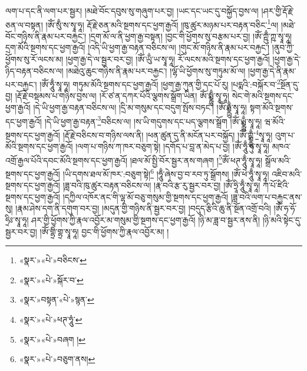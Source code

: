 ལག་པ་དང་ནི་ལག་པར་སྦྱར། །མཐེ་བོང་དབུས་སུ་གཞུག་པར་བྱ། །ཡང་དང་ཡང་དུ་བསྐྱོད་བྱས་ལ། །ཤར་གྱི་རྡོ་རྗེ་ཅན་ལ་བསྟན། །ཨོཾ་སུྃ་ས་སྭཱ་ཧཱ། རྡོ་རྗེ་ཅན་མའི་སྔགས་དང་ཕྱག་རྒྱའོ། །ཁུ་ཚུར་མཉམ་པར་བརྟན་བཅིང་\footnote{«སྣར་»«པེ་»བཅིངས་}ལ། །མཐེ་བོང་གཉིས་ནི་རྣམ་པར་བརྐྱང་། །དྲག་མོ་ལ་ནི་ཕྱག་རྒྱ་བསྟན། །བྱང་གི་ཕྱོགས་སུ་བརྩམ་པར་བྱ། །ཨོཾ་ཀྵུྃ་ཀྵ་སྭཱ་ཧཱ། དྲག་མོའི་སྔགས་དང་ཕྱག་རྒྱའོ། །འདི་ཡི་ཕྱག་རྒྱ་བརྟན་བཅིངས་ལ། །གུང་མོ་གཉིས་ནི་རྣམ་པར་བརྐྱང་། །ནུབ་ཀྱི་ཕྱོགས་སུ་རོ་ལངས་མ། །ཕྱག་རྒྱ་དེ་ལ་སྦྱར་བར་བྱ། །ཨོཾ་ཡུྃ་ཡ་སྭཱ་ཧཱ། རོ་ལངས་མའི་སྔགས་དང་ཕྱག་རྒྱའོ། །ཕྱག་རྒྱ་དེ་ཉིད་བརྟན་བཅིངས་ལ། །མཐེའུ་ཆུང་གཉིས་ནི་རྣམ་པར་བརྐྱང་། །ལྷོ་ཡི་ཕྱོགས་སུ་གཏུམ་མོ་ལ། །ཕྱག་རྒྱ་དེ་ནི་རྣམ་པར་བརྐྱང་། །ཨོཾ་ཧཱུྃ་སྭཱ་ཧཱ། གཏུམ་མོའི་སྔགས་དང་ཕྱག་རྒྱའོ། །ཕྱག་རྒྱ་ཀུན་གྱི་དང་པོ་རུ། །པདྨའི་:བསྐོར་བ་\footnote{«སྣར་»«པེ་»སྐོར་བ་}སྔོན་དུ་བྱ། །རྡོ་རྗེ་བསྡམས་པ་གཉིས་བྱས་ལ། །རོ་ཙ་ན་དཀར་པོའི་ལྕགས་སྒྲོག་ཡིན། ཨོཾ་སྨྼྻུྃ་སྭཱ་ཧཱ། སེང་གེ་མའི་སྔགས་དང་ཕྱག་རྒྱའོ། །དེ་ཡི་ཕྱག་རྒྱ་བརྟན་བཅིངས་ལ། །དྲི་མ་གསུམ་དང་བདུག་སྤོས་བཏང་། །ཨོཾ་ཧྨྼྻུྃ་སྭཱ་ཧཱ། སྟག་མོའི་སྔགས་དང་ཕྱག་རྒྱའོ། །དེ་ཡི་ཕྱག་རྒྱ་བརྟན་\footnote{«སྣར་»བསྟན་«པེ་»སྙན་}བཅིངས་ལ། །ས་ཡི་གདུགས་དང་པད་ལྕགས་སྒྲོག །ཨོཾ་ཡྨྼྻུྃ་སྭཱ་ཧཱ། ཝ་མོའི་སྔགས་དང་ཕྱག་རྒྱའོ། །རྡོ་རྗེ་བཅིངས་བ་གཉིས་ལས་ནི། །ཕན་ཚུན་དུ་ནི་མངོན་པར་བསྐྱོད། །ཨོཾ་ཀྵྨྼྻུྃ་\footnote{«སྣར་»«པེ་»ཕཊ་ཧཱུཾ་}སྭཱ་ཧཱ། འུག་པ་མོའི་སྔགས་དང་ཕྱག་རྒྱའོ། །ལག་པ་གཉིས་ཀ་ཁར་བཅུག་སྟེ། །དགོད་པ་བླ་ན་མེད་པ་བྱ། །ཨོཾ་ཧཱུྃ་ཧུ་སྭཱ་ཧཱ། མཁའ་འགྲོ་རྒྱལ་པོའི་དབང་མོའི་སྔགས་དང་ཕྱག་རྒྱའོ། །ཐལ་མོ་སྤྱི་བོར་སྦྱར་ནས་གཞག །\footnote{«སྣར་»«པེ་»བཞག །}ཨོཾ་ཕཊ་ཧཱུྃ་སྭཱ་ཧཱ། སྒྲོལ་མའི་སྔགས་དང་ཕྱག་རྒྱའོ། །ཡི་དགས་ཐལ་མོ་ཁར་:བཅུག་སྟེ།\footnote{«སྣར་»«པེ་»བཅུག་ནས།} །ཧཱུྃ་ཞེས་བྱ་བ་རབ་ཏུ་སྒྲོགས། །ཨོཾ་ཕེཾ་ཧཱུྃ་སྭཱ་ཧཱ། འཇིབ་མའི་སྔགས་དང་ཕྱག་རྒྱའོ། །ཟླ་བའི་ཁུ་ཚུར་བརྟན་བཅིངས་ལ། །རྣ་བའི་རྩ་རུ་སྦྱར་བར་བྱ། །ཨོཾ་ཧྲཱི་ཧཱུྃ་སྭཱ་ཧཱ། ཀཾ་པོ་ཛིའི་སྔགས་དང་ཕྱག་རྒྱའོ། །དཀྱིལ་འཁོར་ནང་གི་ལྷ་མོ་བཅུ་གསུམ་གྱི་སྔགས་དང་ཕྱག་རྒྱའོ། །ཟླ་བའི་ལག་པ་བརྐྱང་ནས་སུ། །རྣམ་ཤེས་དག་ནི་དགུག་བར་བྱ། །མདུན་གྱི་གཉིས་ནི་སྦྱར་བར་བྱ། །བདུད་རྩིའི་ཆུ་ནི་སྔོན་འགྲོ་བའི། །ཨོཾ་ཧ་ཧོ་ཧྲིཿ་སྭཱ་ཧཱ། ཤར་གྱི་ཕྱོགས་ཀྱི་རྣལ་འབྱོར་མ་གསུམ་གྱི་སྔགས་དང་ཕྱག་རྒྱའོ། །ཉི་མ་ཟླ་བ་སྦྱར་ནས་ནི། །ཉི་མའི་སྟེང་དུ་སྦྱར་བར་བྱ། །ཨོཾ་གྷྲིཾ་གྷྲ་སྭཱ་ཧཱ། བྱང་གི་ཕྱོགས་ཀྱི་རྣལ་འབྱོར་མ། །
